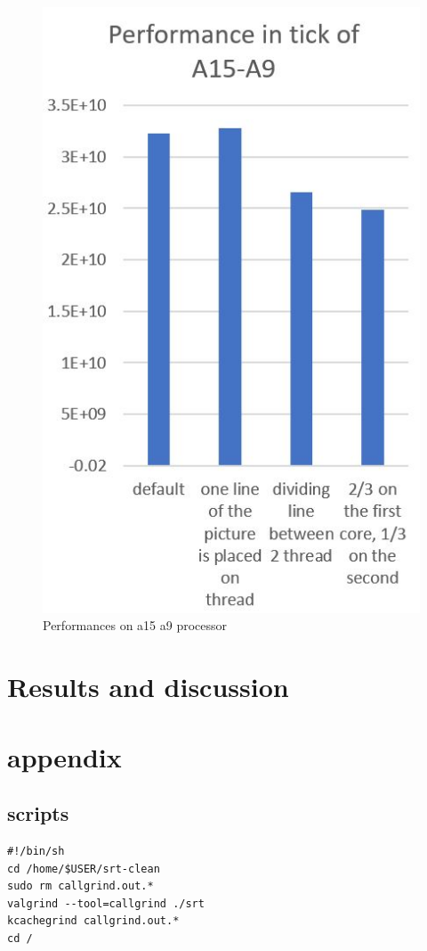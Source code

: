 \documentclass[journal]{IEEEtran}
\begin{document}
\begin{figure}[!h]
	\centering
	\includegraphics[width=.8\linewidth]{a15a9}
	\caption{Performances on a15 a9 processor}
	\label{fig:a15a9}
\end{figure}

\section{Results and discussion}
\label{sec:res}


\section{appendix}
\subsection{scripts}
\begin{lstlisting}
#!/bin/sh
cd /home/$USER/srt-clean
sudo rm callgrind.out.*
valgrind --tool=callgrind ./srt
kcachegrind callgrind.out.*
cd /
\end{lstlisting}
\end{document}
